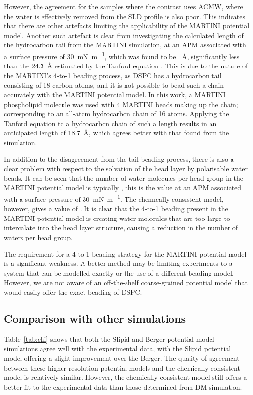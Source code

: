 However, the agreement for the samples where the contrast uses ACMW, where the water is effectively removed from the SLD profile is also poor.
This indicates that there are other artefacts limiting the applicability of the MARTINI potential model.
Another such artefact is clear from investigating the calculated length of the hydrocarbon tail from the MARTINI simulation, at an APM associated with a surface pressure of \SI{30}{\milli\newton\per\meter}, which was found to be ~\si{\angstrom}, significantly less than the \SI{24.3}{\angstrom} estimated by the Tanford equation \cite{tanford_hydrophobic_1980}.
This is due to the nature of the MARTINI's 4-to-1 beading process, as DSPC has a hydrocarbon tail consisting of 18 carbon atoms, and it is not possible to bead such a chain accurately with the MARTINI potential model.
In this work, a MARTINI phospholipid molecule was used with 4 MARTINI beads making up the chain; corresponding to an all-atom hydrocarbon chain of 16 atoms.
Applying the Tanford equation to a hydrocarbon chain of such a length results in an anticipated length of \SI{18.7}{\angstrom}, which agrees better with that found from the simulation.

In addition to the disagreement from the tail beading process, there is also a clear problem with respect to the solvation of the head layer by polarisable water beads.
It can be seen that the number of water molecules per head group in the MARTINI potential model is typically , this is the value at an APM associated with a surface pressure of \SI{30}{\milli\newton\per\meter}.
The chemically-consistent model, however, gives a value of .
It is clear that the 4-to-1 beading present in the MARTINI potential model is creating water molecules that are too large to intercalate into the head layer structure, causing a reduction in the number of waters per head group.

The requirement for a 4-to-1 beading strategy for the MARTINI potential model is a significant weakness.
A better method may be limiting experiments to a system that can be modelled exactly or the use of a different beading model.
However, we are not aware of an off-the-shelf coarse-grained potential model that would easily offer the exact beading of DSPC.

\subsection{Comparison with other simulations}
Table~\ref{tab:chi} shows that both the Slipid and Berger potential model simulations agree well with the experimental data, with the Slipid potential model offering a slight improvement over the Berger.
The quality of agreement between these higher-resolution potential models and the chemically-consistent model is relatively similar.
However, the chemically-consistent model still offers a better fit to the experimental data than those determined from DM simulation.

